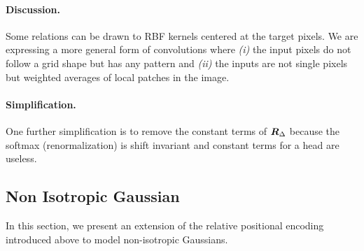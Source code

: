 \documentclass{article} %
\begin{document}
\paragraph{Discussion.} Some relations can be drawn to RBF kernels centered at the target pixels.
We are expressing a more general form of convolutions where
\emph{(i)} the input pixels do not follow a grid shape but has any pattern and 
\emph{(ii)} the inputs are not single pixels but weighted averages of local patches in the image. 

\paragraph{Simplification.} One further simplification is to remove the constant terms of ${\bm{R}}_{\Delta}$ because the softmax (renormalization) is shift invariant and constant terms for a head are useless. 


\subsection{Non Isotropic Gaussian}

In this section, we present an extension of the relative positional encoding introduced above
to model non-isotropic Gaussians.
\end{document}
